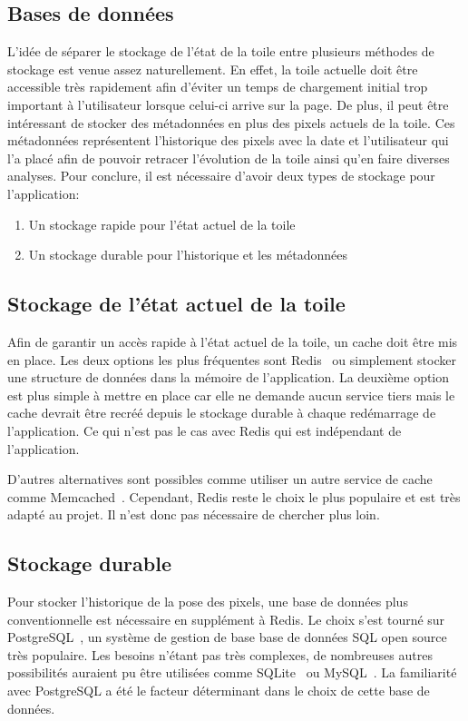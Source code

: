 \subsection{Bases de données}

L'idée de séparer le stockage de l'état de la toile entre plusieurs méthodes de stockage est venue assez naturellement. En effet, la toile actuelle doit être accessible très rapidement afin d'éviter un temps de chargement initial trop important à l'utilisateur lorsque celui-ci arrive sur la page. De plus, il peut être intéressant de stocker des métadonnées en plus des pixels actuels de la toile. Ces métadonnées représentent l'historique des pixels avec la date et l'utilisateur qui l'a placé afin de pouvoir retracer l'évolution de la toile ainsi qu'en faire diverses analyses. Pour conclure, il est nécessaire d'avoir deux types de stockage pour l'application:

\begin{enumerate}
  \item Un stockage rapide pour l'état actuel de la toile
  \item Un stockage durable pour l'historique et les métadonnées
\end{enumerate}

\subsection{Stockage de l'état actuel de la toile}

Afin de garantir un accès rapide à l'état actuel de la toile, un cache doit être mis en place. Les deux options les plus fréquentes sont Redis~\cite{redis} ou simplement stocker une structure de données dans la mémoire de l'application. La deuxième option est plus simple à mettre en place car elle ne demande aucun service tiers mais le cache devrait être recréé depuis le stockage durable à chaque redémarrage de l'application. Ce qui n'est pas le cas avec Redis qui est indépendant de l'application.

D'autres alternatives sont possibles comme utiliser un autre service de cache comme Memcached~\cite{memcached}. Cependant, Redis reste le choix le plus populaire et est très adapté au projet. Il n'est donc pas nécessaire de chercher plus loin.

\subsection{Stockage durable}

Pour stocker l'historique de la pose des pixels, une base de données plus conventionnelle est nécessaire en supplément à Redis. Le choix s'est tourné sur PostgreSQL~\cite{postgresql}, un système de gestion de base base de données SQL open source très populaire. Les besoins n'étant pas très complexes, de nombreuses autres possibilités auraient pu être utilisées comme SQLite~\cite{sqlite} ou MySQL~\cite{mysql}. La familiarité avec PostgreSQL a été le facteur déterminant dans le choix de cette base de données.
